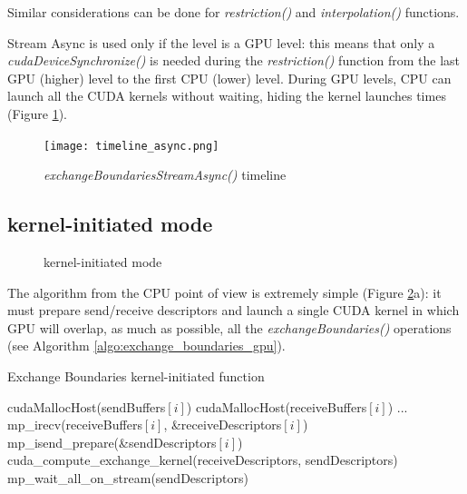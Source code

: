 \documentclass[conference]{IEEEtran}
\begin{document}
Similar considerations can be done for \textit{restriction()} and \textit{interpolation()} functions.

Stream Async is used only if the level is a GPU level: this means that only a \textit{cudaDeviceSynchronize()} is needed during the \textit{restriction()} function from the last GPU (higher) level to the first CPU (lower) level. During GPU levels, CPU can launch all the CUDA kernels without waiting, hiding the kernel launches times (Figure \ref{fig:timeline_async}).

\begin{figure}[h]
\centering
\texttt{[image: timeline\_async.png]}
\caption{\textit{exchangeBoundariesStreamAsync()} timeline}
\label{fig:timeline_async}
\end{figure}

\subsection{kernel-initiated mode}

\begin{figure}
\hfil
{}
\caption{kernel-initiated mode}
\label{fig:gpu_initited}
\end{figure}

The algorithm from the CPU point of view is extremely simple (Figure \ref{fig:gpu_initited}a): it must prepare send/receive descriptors and launch a single CUDA kernel in which GPU will overlap, as much as possible, all the \textit{exchangeBoundaries()} operations (see Algorithm \ref{algo:exchange_boundaries_gpu}).

\begin{algorithm}
\small
\caption{Exchange Boundaries kernel-initiated function}
\label{algo:exchange_boundaries_gpu}
\begin{algorithmic}[1]
\State cudaMallocHost(sendBuffers$[i]$)
\State cudaMallocHost(receiveBuffers$[i]$)
\EndFor
\State ...
		\State mp\_irecv(receiveBuffers$[i]$, \&receiveDescriptors$[i]$)    
	\EndFor
		\State mp\_isend\_prepare(\&sendDescriptors$[i]$)
	\EndFor
	\State cuda\_compute\_exchange\_kernel(receiveDescriptors, sendDescriptors)
	\State mp\_wait\_all\_on\_stream(sendDescriptors)
\EndFunction
\end{algorithmic}
\end{algorithm}
\end{document}
